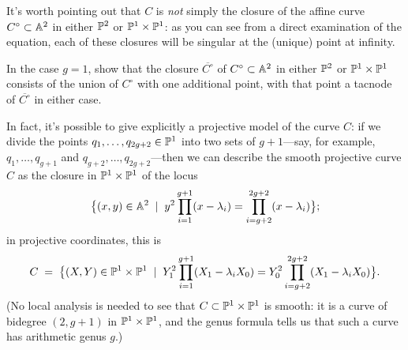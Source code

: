   It's worth pointing out that $C$ is \emph{not} simply the closure of the affine curve $C^\circ \subset \AA^2$ in either $\PP^2$ or $\PP^1 \times \PP^1$: as you can see from a direct examination of the equation, each of these closures will be singular at the (unique) point at infinity.
  
  \begin{exercise}
  In the case $g=1$, show that the closure $\overline{C^\circ}$ of $C^\circ \subset \AA^2$ in either $\PP^2$ or $\PP^1 \times \PP^1$ consists of the union of $C^\circ$ with one additional point, with that point a tacnode of $\overline{C^\circ}$ in either case.
  \end{exercise}
  
  In fact, it's possible to give explicitly a projective model of the curve $C$: if we divide the points $q_1,\dots,q_{2g+2} \in \PP^1$ into two sets of $g+1$---say, for example, $q_1,\dots,q_{g+1}$ and $q_{g+2}, \dots, q_{2g+2}$---then we can describe the smooth projective curve $C$ as the closure in $\PP^1 \times \PP^1$ of the  locus
  $$
  \big\{ (x,y) \in \AA^2 \; \mid \; y^2\prod_{i=1}^{g+1} (x - \lambda_i) = \prod_{i=g+2}^{2g+2} (x - \lambda_i) \big\};
  $$
  in projective coordinates, this is
   $$
  C \; = \; \big\{ (X,Y) \in \PP^1 \times \PP^1 \; \mid \; Y_1^2\prod_{i=1}^{g+1} (X_1 - \lambda_iX_0) = Y_0^2\prod_{i=g+2}^{2g+2} (X_1 - \lambda_iX_0) \big\}.
  $$
  (No local analysis is needed to see that $C \subset \PP^1 \times \PP^1$ is smooth: it is a curve of bidegree $(2,g+1)$ in $\PP^1 \times \PP^1$, and the genus formula tells us that such a curve has arithmetic genus $g$.)
  
